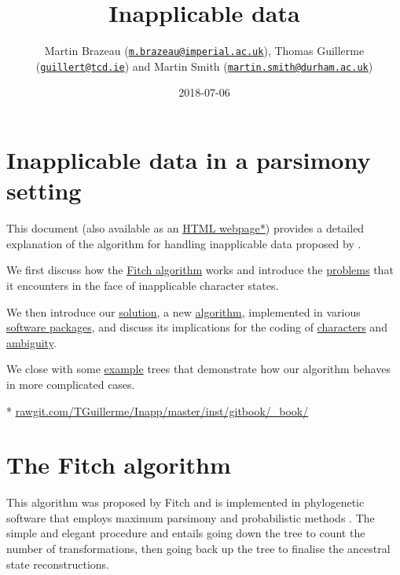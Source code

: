 \documentclass[]{book}
\title{Inapplicable data}
\author{Martin Brazeau
(\href{mailto:m.brazeau@imperial.ac.uk}{\nolinkurl{m.brazeau@imperial.ac.uk}}),
Thomas Guillerme
(\href{mailto:guillert@tcd.ie}{\nolinkurl{guillert@tcd.ie}}) and Martin
Smith
(\href{mailto:martin.smith@durham.ac.uk}{\nolinkurl{martin.smith@durham.ac.uk}})}
\date{2018-07-06}
\theoremstyle{definition}
\theoremstyle{definition}
\theoremstyle{definition}
\theoremstyle{remark}
\begin{document}
\maketitle

{
\setcounter{tocdepth}{1}
\tableofcontents
}
\hypertarget{inapplicable-data-in-a-parsimony-setting}{%
\chapter*{Inapplicable data in a parsimony
setting}\label{inapplicable-data-in-a-parsimony-setting}}

This document (also available as an
\href{https://rawgit.com/TGuillerme/Inapp/master/inst/gitbook/_book/index.html}{HTML
webpage*}) provides a detailed explanation of the algorithm for handling
inapplicable data proposed by \citet{Brazeau2018}.

We first discuss how the \protect\hyperlink{fitch}{Fitch algorithm}
works and introduce the \protect\hyperlink{problems}{problems} that it
encounters in the face of inapplicable character states.

We then introduce our \protect\hyperlink{solution}{solution}, a new
\protect\hyperlink{algorithm}{algorithm}, implemented in various
\protect\hyperlink{software}{software packages}, and discuss its
implications for the coding of \protect\hyperlink{coding}{characters}
and \protect\hyperlink{ambiguity}{ambiguity}.

We close with some \protect\hyperlink{examples}{example} trees that
demonstrate how our algorithm behaves in more complicated cases.

*
\href{https://rawgit.com/TGuillerme/Inapp/master/inst/gitbook/_book/index.html}{rawgit.com/TGuillerme/Inapp/master/inst/gitbook/\_book/}

\hypertarget{fitch}{%
\chapter{The Fitch algorithm}\label{fitch}}

This algorithm was proposed by Fitch \citeyearpar{Fitch1971} and is
implemented in phylogenetic software that employs maximum parsimony
\citep{swofford2001paup, Goloboff2016} and probabilistic methods
\citep{Ronquist2012mrbayes, Stamatakis2014}. The simple and elegant
procedure and entails going down the tree to count the number of
transformations, then going back up the tree to finalise the ancestral
state reconstructions.
\end{document}
